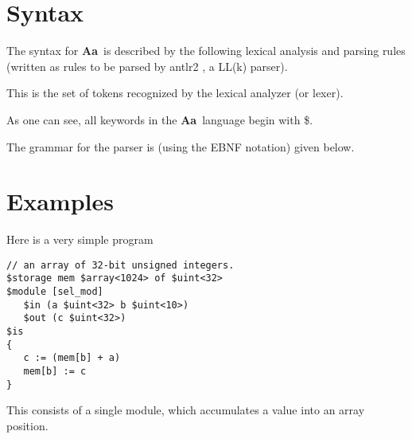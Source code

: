 \documentclass{article}
\newcommand{\Aa}{{\bf Aa}~}
\begin{document}
\section{Syntax}

The syntax for \Aa is described by the following lexical analysis and
parsing rules (written as rules to be parsed by antlr2 \cite{ref:antlr2},
a LL(k) parser).

This is the set of tokens recognized by the lexical analyzer (or lexer).

As one can see, all keywords in the \Aa language begin with \$.

The grammar for the parser is (using the EBNF notation) given below. 


\section{Examples}

Here is a very simple program
\begin{verbatim}
// an array of 32-bit unsigned integers.
$storage mem $array<1024> of $uint<32> 
$module [sel_mod]
   $in (a $uint<32> b $uint<10>)
   $out (c $uint<32>)
$is
{
   c := (mem[b] + a)
   mem[b] := c
}
\end{verbatim}
This consists of a single module, which accumulates
a value into an array position.
\end{document}
